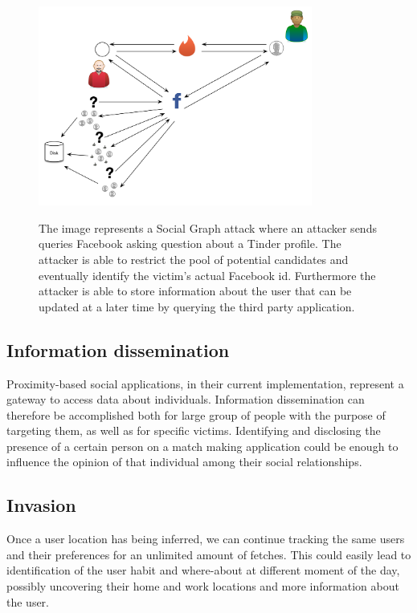 \begin{figure}[tb!]
\centering\hspace*{\fill}
{\includegraphics[width=90mm]{figures/attack_scenario.png}%
\label{graph}}\hspace*{\fill}
\caption[Social Graph attack]{The image represents a Social Graph attack where an attacker sends queries Facebook asking question about a Tinder profile. The attacker is able to restrict the pool of potential candidates and eventually identify the victim's actual Facebook id. Furthermore the attacker is able to store information about the user that can be updated at a later time by querying the third party application.}
\label{fig:fgs}
\end{figure}

\subsection{Information dissemination}

Proximity-based social applications, in their current implementation, represent a gateway to access data about individuals. Information dissemination can therefore be accomplished both for large group of people with the purpose of targeting them, as well as for specific victims.
Identifying and disclosing the presence of a certain person on a match making application could be enough to influence the opinion of that individual among their social relationships.

\subsection{Invasion}
Once a user location has being inferred, we can continue tracking the same users and their preferences for an unlimited amount of fetches. This could easily lead to identification of the user habit and where-about at different moment of the day, possibly uncovering their home and work locations and more information about the user.

